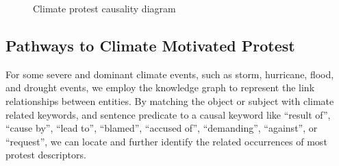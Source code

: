 \documentclass[9pt,twocolumn,twoside]{pnas-new}
\begin{document}
\begin{figure}[htb]
	\centering
	\caption{Climate protest causality diagram}
\label{three-causality}
\end{figure}


\subsection*{Pathways to Climate Motivated Protest}
For some severe and dominant climate events, such as storm, hurricane, flood, and drought events, we employ the knowledge graph to represent the link relationships between entities. By matching the object or subject with climate related keywords, and sentence predicate to a causal keyword like ``result of'', ``cause by'', ``lead to'', ``blamed'', ``accused of'', ``demanding'', ``against'', or ``request'', we can locate and further identify the related occurrences of most protest descriptors.
\end{document}
